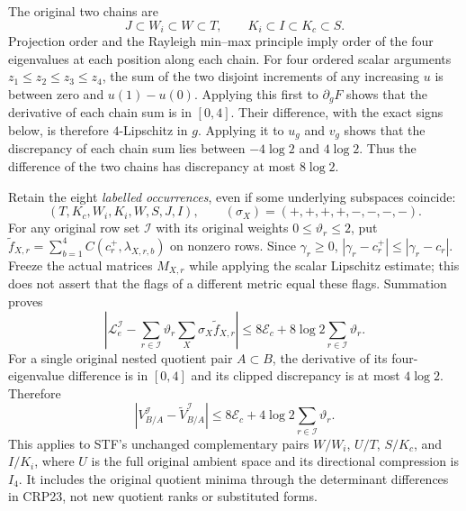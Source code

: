 \documentclass[11pt,a4paper]{article}
\begin{document}
The original two chains are
\[
J\subset W_i\subset W\subset T,\qquad
K_i\subset I\subset K_c\subset S.\tag{CRP26}
\]
Projection order and the Rayleigh min--max principle imply order of
the four eigenvalues at each position along each chain. For four
ordered scalar arguments $z_1\le z_2\le z_3\le z_4$, the sum of
the two disjoint increments of any increasing $u$ is between zero
and $u(1)-u(0)$. Applying this first to $\partial_gF$ shows that the
derivative of each chain sum is in $[0,4]$. Their difference,
with the exact signs below, is therefore $4$-Lipschitz in $g$.
Applying it to $u_g$ and $v_g$ shows that the discrepancy of each
chain sum lies between $-4\log2$ and $4\log2$. Thus the difference
of the two chains has discrepancy at most $8\log2$.

Retain the eight \emph{labelled occurrences}, even if some underlying
subspaces coincide:
\[
(T,K_c,W_i,K_i,W,S,J,I),\qquad
(\sigma_X)=(+,+,+,+,-,-,-,-).\tag{CRP27}
\]
For any original row set $\mathscr I$ with its original weights
$0\le\vartheta_r\le2$, put
$\widetilde f_{X,r}=\sum_{b=1}^4C(c_r^+,\lambda_{X,r,b})$ on nonzero
rows. Since $\gamma_r\ge0$,
$|\gamma_r-c_r^+|\le|\gamma_r-c_r|$. Freeze the actual matrices
$M_{X,r}$ while applying the scalar Lipschitz estimate; this does
not assert that the flags of a different metric equal these flags.
Summation proves
\[
\boxed{\left|\mathcal L_e^{\mathscr I}-
 \sum_{r\in\mathscr I}\vartheta_r\sum_X\sigma_X\widetilde f_{X,r}\right|
 \le8\mathcal E_c+8\log2\sum_{r\in\mathscr I}\vartheta_r.}
\tag{CRP28}
\]
For a single original nested quotient pair $A\subset B$, the
derivative of its four-eigenvalue difference is in $[0,4]$ and its
clipped discrepancy is at most $4\log2$. Therefore
\[
\boxed{|V_{B/A}^{\mathscr I}-\widetilde V_{B/A}^{\mathscr I}|
 \le8\mathcal E_c+4\log2\sum_{r\in\mathscr I}\vartheta_r.}
\tag{CRP29}
\]
This applies to STF's unchanged complementary pairs $W/W_i$,
$U/T$, $S/K_c$, and $I/K_i$, where $U$ is the full original ambient
space and its directional compression is $I_4$. It includes the
original quotient minima through the determinant differences in
CRP23, not new quotient ranks or substituted forms.
\end{document}

